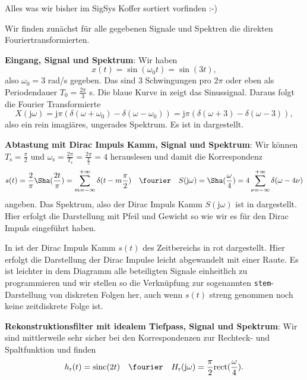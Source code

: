 \begin{Werkzeug}
Alles was wir bisher im SigSys Koffer sortiert vorfinden :-)
\end{Werkzeug}
\begin{Ansatz}
Wir finden zunächst für alle gegebenen Signale und Spektren die direkten
Fouriertransformierten.

\textbf{Eingang, Signal und Spektrum}:
Wir haben
\begin{equation}
x(t) = \sin(\omega_0 t) = \sin(3 t),
\end{equation}
also  $\omega_0=3$ rad/s gegeben. Das sind 3 Schwingungen pro $2\pi$ oder eben
als Periodendauer $T_0 = \frac{2\pi}{3}$ s.
Die blaue Kurve in  zeigt das Sinussignal.
Daraus folgt die Fourier Transformierte
\begin{equation}
X(\mathrm{j} \omega) =
\mathrm{j} \pi \left( \delta(\omega+\omega_0) - \delta(\omega-\omega_0) \right) =
\mathrm{j} \pi \left( \delta(\omega+3) - \delta(\omega-3) \right),
\end{equation}
also ein rein imagiäres, ungerades Spektrum. Es ist in 
dargestellt.

\textbf{Abtastung mit Dirac Impuls Kamm, Signal und Spektrum}:
Wir können $T_\mathrm{s} = \frac{\pi}{2}$ und
$\omega_\mathrm{s} = \frac{2 \pi}{T_\mathrm{s}} = \frac{2 \pi}{\frac{\pi}{2}} = 4$
herauslesen und damit die Korrespondenz
\begin{equation}
s(t) = \frac{2}{\pi} {\Sha}(\frac{2 t}{\pi}) =
\sum_{m=-\infty}^{+\infty} \delta(t-m \frac{\pi}{2})
\quad\fourier\quad
S(\mathrm{j}\omega) = {\Sha}(\frac{\omega}{4}) =
4 \sum_{\nu=-\infty}^{+\infty} \delta(\omega-4 \nu)
\end{equation}
angeben. Das Spektrum, also der Dirac Impuls Kamm $S(\mathrm{j}\omega)$
ist in 
dargestellt. Hier erfolgt die Darstellung mit Pfeil und Gewicht so wie wir es
für den Dirac Impuls eingeführt haben.

In  ist der Dirac Impuls Kamm $s(t)$ des Zeitbereichs
in rot dargestellt. Hier erfolgt die Darstellung der Dirac Impulse leicht abgewandelt
mit einer Raute. Es ist leichter in dem Diagramm alle beteiligten Signale einheitlich
zu programmieren und wir stellen so die Verknüpfung zur sogenannten
\texttt{stem}-Darstellung von diskreten Folgen her, auch wenn $s(t)$ streng genommen
noch keine zeitdiskrete Folge ist.

\textbf{Rekonstruktionsfilter mit idealem Tiefpass, Signal und Spektrum}:
Wir sind mittlerweile sehr sicher bei den Korrespondenzen zur Rechteck- und
Spaltfunktion und finden
\begin{equation}
h_\mathrm{r}(t) = \mathrm{sinc}(2 t) \quad\fourier\quad
H_\mathrm{r}(\mathrm{j}\omega) = \frac{\pi}{2}\mathrm{rect}(\frac{\omega}{4}).
\end{equation}


\end{Ansatz}
